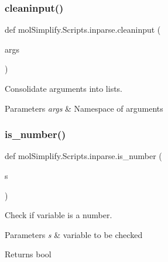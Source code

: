 \subsubsection{\texorpdfstring{cleaninput()}{cleaninput()}}
{\footnotesize\ttfamily def mol\+Simplify.\+Scripts.\+inparse.\+cleaninput (\begin{DoxyParamCaption}\item[{}]{args }\end{DoxyParamCaption})}



Consolidate arguments into lists. 


\begin{DoxyParams}{Parameters}
{\em args} & Namespace of arguments \\
\hline
\end{DoxyParams}
\mbox{\label{namespacemolSimplify_1_1Scripts_1_1inparse_afa3d9a7077dc2f5980b8ee730a08b8ff}} 
\subsubsection{\texorpdfstring{is\+\_\+number()}{is\_number()}}
{\footnotesize\ttfamily def mol\+Simplify.\+Scripts.\+inparse.\+is\+\_\+number (\begin{DoxyParamCaption}\item[{}]{s }\end{DoxyParamCaption})}



Check if variable is a number. 


\begin{DoxyParams}{Parameters}
{\em s} & variable to be checked \\
\hline
\end{DoxyParams}
\begin{DoxyReturn}{Returns}
bool 
\end{DoxyReturn}
\mbox{\label{namespacemolSimplify_1_1Scripts_1_1inparse_a5104aa57a2921d18ecc99221dea8b6d7}} 

